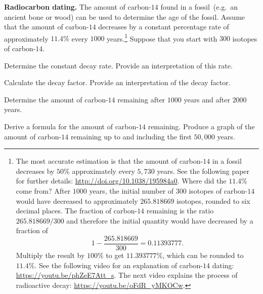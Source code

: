 \documentclass[a4paper,oneside,12pt]{article}
\begin{document}
\begin{example}
\label{eg:radiocarbon_dating}
\textbf{Radiocarbon dating.}
The amount of carbon-$14$ found in a fossil~(e.g.~an ancient bone or
wood) can be used to determine the age of the fossil.  Assume that the
amount of carbon-$14$ decreases by a constant percentage rate of
approximately $11.4\%$ every $1000$ years.\footnote{
  The most accurate estimation is that the amount of carbon-$14$ in a
  fossil decreases by $50\%$ approximately every $5,730$ years.  See
  the following paper for further details:
  \url{http://doi.org/10.1038/195984a0}.  Where did the $11.4\%$ come
  from?  After $1000$ years, the initial number of $300$ isotopes of
  carbon-$14$ would have decreased to approximately $265.818669$
  isotopes, rounded to six decimal places.  The fraction of
  carbon-$14$ remaining is the ratio $265.818669 / 300$ and therefore
  the initial quantity would have decreased by a fraction of
  \[
  1 - \frac{265.818669}{300}
  =
  0.11393777.
  \]
  Multiply the result by $100\%$ to get $11.393777\%$, which can be
  rounded to $11.4\%$.  See the following video for an explanation of
  carbon-$14$ dating: \url{https://youtu.be/phZeE7Att_s}.  The next
  video explains the process of radioactive decay:
  \url{https://youtu.be/oFdR_yMKOCw}.
}
Suppose that you start with $300$ isotopes of carbon-$14$.
\begin{packedenum}
\item\label{subeg:carbon14_decay_rate}
  Determine the constant decay rate.  Provide an interpretation of
  this rate.

\item\label{subeg:carbon14_decay_factor}
  Calculate the decay factor.  Provide an interpretation of the decay
  factor.

\item\label{subeg:carbon14_after_1000_and_2000_years}
  Determine the amount of carbon-$14$ remaining after $1000$ years and
  after $2000$ years.

\item\label{subeg:carbon14_formula_graph}
  Derive a formula for the amount of carbon-$14$ remaining.  Produce a
  graph of the amount of carbon-$14$ remaining up to and including the
  first $50,000$ years.
\end{packedenum}
\end{example}
\end{document}
